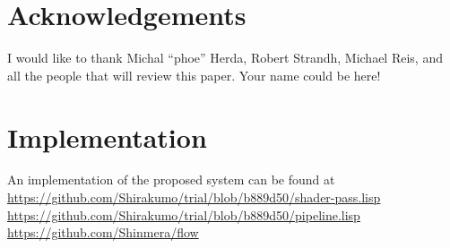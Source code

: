 \documentclass[format=sigconf]{acmart}
\begin{document}
\section{Acknowledgements}\label{acknowledgements}
I would like to thank Michal ``phoe'' Herda, Robert Strandh, Michael Reis, and all the people that will review this paper. Your name could be here!

\section{Implementation}\label{implementation}
An implementation of the proposed system can be found at \\
\url{https://github.com/Shirakumo/trial/blob/b889d50/shader-pass.lisp} \\
\url{https://github.com/Shirakumo/trial/blob/b889d50/pipeline.lisp} \\
\url{https://github.com/Shinmera/flow} \\


\end{document}
